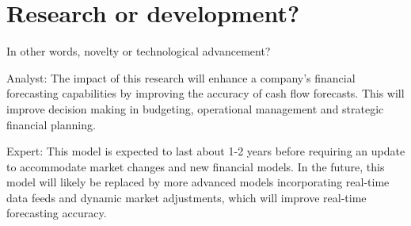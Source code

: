 \documentclass[12pt]{article}
\begin{document}
\section{Research or development?}
In other words, novelty or technological advancement?


{Analyst:} The impact of this research will enhance a company's financial forecasting capabilities by improving the accuracy of cash flow forecasts. This will improve decision making in budgeting, operational management and strategic financial planning.

{Expert:} This model is expected to last about 1-2 years before requiring an update to accommodate market changes and new financial models. In the future, this model will likely be replaced by more advanced models incorporating real-time data feeds and dynamic market adjustments, which will improve real-time forecasting accuracy.

%
%
\end{document}
